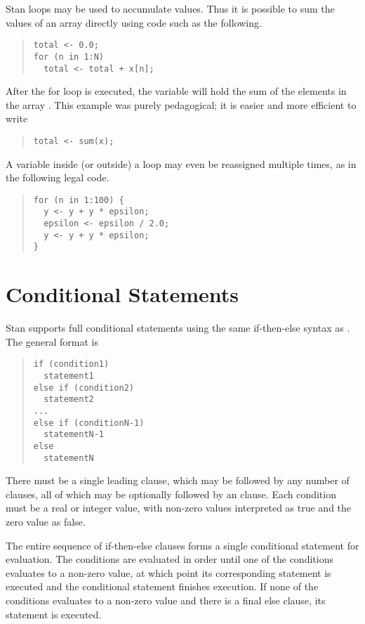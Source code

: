Stan loops may be used to accumulate values.  Thus it is possible to
sum the values of an array directly using code such as the
following.
%
\begin{quote}
\begin{Verbatim}
total <- 0.0;
for (n in 1:N) 
  total <- total + x[n];
\end{Verbatim}
\end{quote}
%
After the for loop is executed, the variable  will hold
the sum of the elements in the array .  This example was
purely pedagogical; it is easier and more efficient to write
%
\begin{quote}
\begin{Verbatim}
total <- sum(x);
\end{Verbatim}
\end{quote}

A variable inside (or outside) a loop may even be reassigned multiple
times, as in the following legal code.
%
\begin{quote}
\begin{Verbatim}
for (n in 1:100) {
  y <- y + y * epsilon;
  epsilon <- epsilon / 2.0;
  y <- y + y * epsilon;
}
\end{Verbatim}
\end{quote}

\section{Conditional Statements}

Stan supports full conditional statements using
the same if-then-else syntax as \Cpp.  The general format is
%
\begin{quote}
\begin{Verbatim}
if (condition1)
  statement1
else if (condition2)
  statement2
...
else if (conditionN-1)
  statementN-1
else
  statementN
\end{Verbatim}
\end{quote}
%
There must be a single leading  clause, which may be followed
by any number of  clauses, all of which may be
optionally followed by an  clause.  Each condition must be
a real or integer value, with non-zero values interpreted as true and
the zero value as false.

The entire sequence of if-then-else clauses forms a single conditional
statement for evaluation.  The conditions are evaluated in order
until one of the conditions evaluates to a non-zero value, at which
point its corresponding statement is executed and the conditional
statement finishes execution.  If none of the conditions evaluates to
a non-zero value and there is a final else clause, its statement is
executed.  

